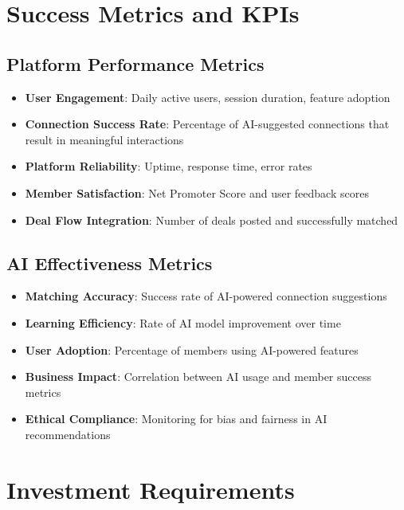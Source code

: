 \section{Success Metrics and KPIs}

\subsection{Platform Performance Metrics}
\begin{itemize}
    \item \textbf{User Engagement}: Daily active users, session duration, feature adoption
    \item \textbf{Connection Success Rate}: Percentage of AI-suggested connections that result in meaningful interactions
    \item \textbf{Platform Reliability}: Uptime, response time, error rates
    \item \textbf{Member Satisfaction}: Net Promoter Score and user feedback scores
    \item \textbf{Deal Flow Integration}: Number of deals posted and successfully matched
\end{itemize}

\subsection{AI Effectiveness Metrics}
\begin{itemize}
    \item \textbf{Matching Accuracy}: Success rate of AI-powered connection suggestions
    \item \textbf{Learning Efficiency}: Rate of AI model improvement over time
    \item \textbf{User Adoption}: Percentage of members using AI-powered features
    \item \textbf{Business Impact}: Correlation between AI usage and member success metrics
    \item \textbf{Ethical Compliance}: Monitoring for bias and fairness in AI recommendations
\end{itemize}

\section{Investment Requirements}


